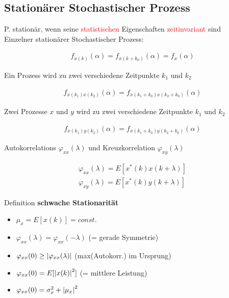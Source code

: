 \documentclass[10pt,a4paper]{article}
\begin{document}
\subsection{Stationärer Stochastischer Prozess}
P. stationär, wenn seine \textcolor{red}{statistischen} Eigenschaften \textcolor{red}{zeitinvariant} sind \\
Einzelner stationärer Stochastischer Prozess:
  \begin{mdframed}[style=exercise]
    \begin{align}
        f_{x(k)}(\alpha) = f_{x(k+k_0)}(\alpha) = f_x(\alpha)
    \end{align}
  \end{mdframed}
Ein Prozess wird zu zwei verschiedene Zeitpunkte $k_1$ und $k_2$
  \begin{mdframed}[style=exercise]
    \begin{align}
        f_{x(k_1)x(k_2)}(\alpha) = f_{x(k_1+k_0)x(k_2+k_0)}(\alpha)
    \end{align}
  \end{mdframed}
Zwei Prozesse $x$ und $y$ wird zu zwei verschiedene Zeitpunkte $k_1$ und $k_2$
\begin{mdframed}[style=exercise]
    \begin{align}
        f_{x(k_1)y(k_2)}(\alpha) = f_{x(k_1+k_0)y(k_2+k_0)}(\alpha)
    \end{align}
  \end{mdframed}
Autokorrelations $\varphi_{xx}(\lambda)$ und Kreuzkorrelation $\varphi_{xy}(\lambda)$
\begin{mdframed}[style=exercise]
    \begin{align}
        \varphi_{xx}(\lambda) = E[x^*(k)x(k+\lambda)] \\
        \varphi_{xy}(\lambda) =E[x^*(k)y(k+\lambda)]
    \end{align}
  \end{mdframed}
Definition \textbf{schwache Stationarität}
\begin{itemize}
    \item $\mu_x = E[x(k)] = const.$
    \item $\varphi_{xx}(\lambda) = \varphi_{xx}(-\lambda)$ (= gerade Symmetrie)
    \item $\varphi_{xx}(0) \geq \abs{\varphi_{xx}(\lambda)}$ (max(Autokorr.) im Ursprung)
    \item $\varphi_{xx}(0) =E[\abs{x(k)}^2]$ (= mittlere Leistung)
    \item $\varphi_{xx}(0) = \sigma_x^2 + \abs{\mu_x}^2$
\end{itemize}
\end{document}
